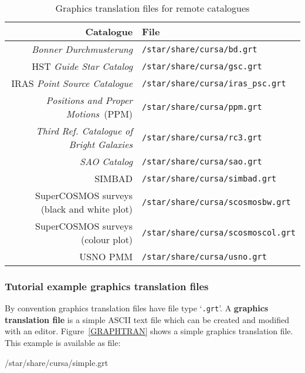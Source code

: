\documentclass[twoside,11pt]{starlink}
\begin{document}
\begin{table}[htbp]

\begin{center}
\begin{tabular}{rl}
Catalogue & File \\ \hline
\textit{Bonner Durchmusterung}                & \texttt{/star/share/cursa/bd.grt}  \\
HST \textit{Guide Star Catalog}               & \texttt{/star/share/cursa/gsc.grt} \\
IRAS \textit{Point Source Catalogue}          & \texttt{/star/share/cursa/iras\_psc.grt} \\
\textit{Positions and Proper Motions}\, (PPM) & \texttt{/star/share/cursa/ppm.grt} \\
\textit{Third Ref. Catalogue of Bright Galaxies} & \texttt{/star/share/cursa/rc3.grt} \\
\textit{SAO Catalog}                          & \texttt{/star/share/cursa/sao.grt} \\
SIMBAD                                     & \texttt{/star/share/cursa/simbad.grt} \\
SuperCOSMOS surveys (black and white plot) & \texttt{/star/share/cursa/scosmosbw.grt}  \\
SuperCOSMOS surveys (colour plot)          & \texttt{/star/share/cursa/scosmoscol.grt} \\
USNO PMM                                   & \texttt{/star/share/cursa/usno.grt} \\
\end{tabular}
\end{center}

\caption{Graphics translation files for remote catalogues \label{EXAMPLEGRT} }

\end{table}

\subsubsection{Tutorial example graphics translation files}

By convention graphics translation files have file type `\texttt{.grt}'.
A \textbf{graphics translation file} is a simple ASCII text file which
can be created and modified with an editor.  Figure~\ref{GRAPHTRAN}
shows a simple graphics translation file.  This example is available as
file:

\begin{terminalv}
/star/share/cursa/simple.grt
\end{terminalv}
\end{document}
